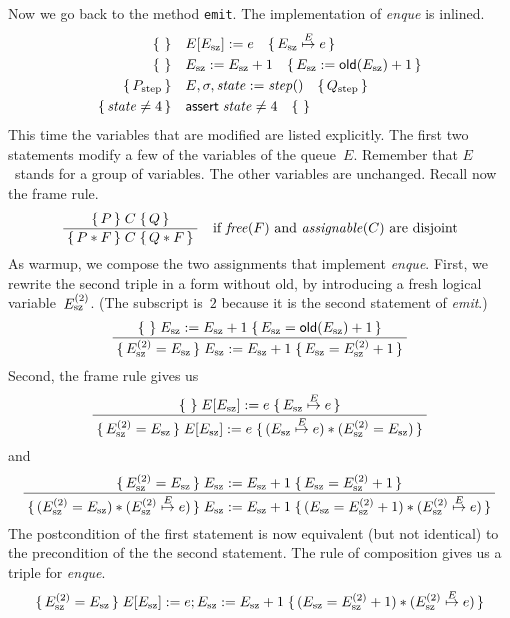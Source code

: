 \documentclass{article} %
\newcommand{\infer}[2]{\frac{\displaystyle\;#1\;}{\displaystyle\;#2\;}}
\newcommand{\3}[3]{\{\,#1\,\}\;#2\;\{\,#3\,\}}
\begin{document}
Now we go back to the method {\tt emit}.
The implementation of {\it enque\/} is inlined.
\begin{align*}
\{\,\,\}
  \quad&E[E_{\rm sz}]:=e
  \quad\{\,E_{\rm sz}\stackrel E\mapsto e\,\} \\
\{\,\,\}
  \quad&E_{\rm sz}:=E_{\rm sz}+1
  \quad\{\,E_{\rm sz}:={\sf old}(E_{\rm sz})+1\,\} \\
\{\,P_{\rm step}\,\}\quad&E,\sigma,{\it state}:={\it step}()\quad
  \{\,Q_{\rm step}\,\} \\
\{\,{\it state}\ne4\,\}\quad&{\sf assert}\;{\it state}\ne4\quad\{\,\,\}
\end{align*}
This time the variables that are modified are listed explicitly.
The first two statements modify a few of the variables of the queue~$E$.
Remember that $E$~stands for a group of variables.
The other variables are unchanged.
Recall now the frame rule.
\[\infer
  {\3{P}{C}{Q}}
  {\3{P*F}{C}{Q*F}}
  \quad\text{if ${\it free}(F)$ and ${\it assignable}(C)$ are disjoint}
\]
As warmup, we compose the two assignments that implement {\it enque}.
First, we rewrite the second triple in a form without {\sf old}, by introducing a fresh logical variable~$E^{(2)}_{\rm sz}$.
(The subscript is~$2$ because it is the second statement of {\it emit}.)
\[\infer
  {\3{}{E_{\rm sz}:=E_{\rm sz}+1}{E_{\rm sz}={\sf old}(E_{\rm sz})+1}}
  {\3
    {E^{(2)}_{\rm sz}=E_{\rm sz}}
    {E_{\rm sz}:=E_{\rm sz}+1}
    {E_{\rm sz}=E^{(2)}_{\rm sz}+1}}
  \]
Second, the frame rule gives us
\[\infer
  {\3{}{E[E_{\rm sz}]:=e}{E_{\rm sz}\stackrel E\mapsto e}}
  {\3
    {E^{(2)}_{\rm sz}=E_{\rm sz}}
    {E[E_{\rm sz}]:=e}
    {(E_{\rm sz}\stackrel E\mapsto e)*(E^{(2)}_{\rm sz}=E_{\rm sz})}} \]
and
\[\infer
  {\3
    {E^{(2)}_{\rm sz}=E_{\rm sz}}
    {E_{\rm sz}:=E_{\rm sz}+1}
    {E_{\rm sz}=E^{(2)}_{\rm sz}+1}}
  {\3
    {(E^{(2)}_{\rm sz}=E_{\rm sz})*(E^{(2)}_{\rm sz}\stackrel E\mapsto e)}
    {E_{\rm sz}:=E_{\rm sz}+1}
    {(E_{\rm sz}=E^{(2)}_{\rm sz}+1)*(E^{(2)}_{\rm sz}\stackrel E\mapsto e)}}
\]
The postcondition of the first statement is now equivalent (but not identical) to the precondition of the the second statement.
The rule of composition gives us a triple for {\it enque}.
\[\3
  {E^{(2)}_{\rm sz}=E_{\rm sz}}
  {E[E_{\rm sz}]:=e; E_{\rm sz}:=E_{\rm sz}+1}
  {(E_{\rm sz}=E^{(2)}_{\rm sz}+1)*(E^{(2)}_{\rm sz}\stackrel E\mapsto e)} \]

\medskip
\end{document}
